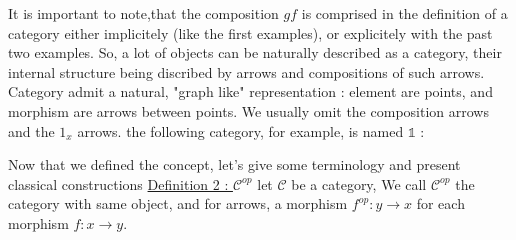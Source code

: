 \documentclass{article}
\begin{document}
\noindent 
It is important to note,that the composition $gf$ is comprised in the definition of a category either implicitely (like the first examples), or explicitely with the past two examples. \newline
\newline
So, a lot of objects can be naturally described as a category, their internal structure being discribed by arrows and compositions of such arrows. \newline
Category admit a natural, "graph like" representation : element are points, and morphism are arrows between points. We usually omit the composition arrows and the $1_x$ arrows. the following category, for example, is named $\mathbb{1}$ : \newline

\newline

\noindent Now that we defined the concept, let's give some terminology and present classical constructions \newline \newline \newline
\large \underline{Definition 2 : $\mathcal{C}^{op}$} \normalsize 
let $\mathcal{C}$ be a category,  \newline We call $\mathcal{C}^{op}$ the category with same object, and for arrows, a morphism \newline  $f^{op} : y \rightarrow x$ for each morphism $f : x \rightarrow y$.
\end{document}
